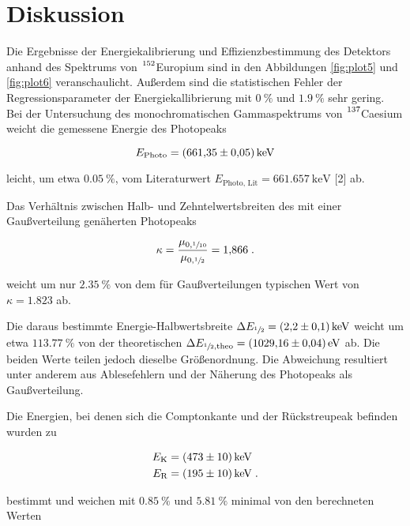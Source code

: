 \section{Diskussion}
\label{sec:Diskussion}

Die Ergebnisse der Energiekalibrierung und Effizienzbestimmung des Detektors anhand des 
Spektrums von $\ce{^{152}}$Europium sind in den Abbildungen \ref{fig:plot5} und \ref{fig:plot6}
veranschaulicht. 
Außerdem sind die statistischen Fehler der Regressionsparameter der Energiekallibrierung mit $\SI{0}{\percent}$ 
und $\SI{1.9}{\percent}$ sehr gering.\\

Bei der Untersuchung des monochromatischen Gammaspektrums von $\ce{^{137}}$Caesium
weicht die gemessene Energie des Photopeaks

\begin{equation*}
    E_\text{Photo} = \SI{661.35 +- 0.05}{\kilo\eV}
  \end{equation*}
  
leicht, um etwa $\SI{0.05}{\percent}$, vom Literaturwert $E_\text{Photo, Lit} = \SI{661.657}{\kilo\eV}$ [2] ab. 

Das Verhältnis zwischen Halb- und Zehntelwertsbreiten des mit einer Gaußverteilung genäherten Photopeaks

\begin{equation}
  \kappa = \frac{\mu_{0, \sfrac{1}{10}}}{\mu_{0, \sfrac{1}{2}}} = \num{1.866}\; .
\end{equation}

weicht um nur $\SI{2.35}{\percent}$ von dem für Gaußverteilungen typischen Wert von $\kappa = \num{1.823}$ ab.

Die daraus bestimmte Energie-Halbwertsbreite $\Delta E_{\sfrac{1}{2}} = \SI{2.2 +- 0.1}{\kilo\eV}$ weicht um etwa
$\SI{113.77}{\percent}$ von der theoretischen $\Delta E_{\sfrac{1}{2}, \text{theo}} = \SI{1029.16 +- 0.04}{\eV}$ ab.
Die beiden Werte teilen jedoch dieselbe Größenordnung.
Die Abweichung resultiert unter anderem aus Ablesefehlern und der Näherung des Photopeaks als Gaußverteilung.

Die Energien, bei denen sich die Comptonkante und der Rückstreupeak befinden wurden zu

\begin{align*}
    E_\text{K} &= \SI{473 +- 10}{\kilo\eV} \\
    E_\text{R} &= \SI{195 +- 10}{\kilo\eV} \; .
\end{align*}

bestimmt und weichen mit $\SI{0.85}{\percent}$ und $\SI{5.81}{\percent}$ minimal von den berechneten Werten

